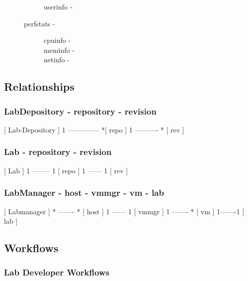 \documentclass[11pt]{article}
\begin{document}
\begin{description}
\begin{description}
\begin{description}
\item [userinfo -]
\end{description}

\item [perfstats -]

\begin{description}
\item [cpuinfo -]
\item [meminfo -]
\item [netinfo -]
\end{description}

\end{description}

\end{description}
\subsection{Relationships}
\label{sec-3.4}

\subsubsection{LabDepository - repository - revision}
\label{sec-3.4.1}


 [ Lab-Depository ] 1 -------------- *[ repo ] 1 ---------- * [ rev ]

\subsubsection{Lab - repository - revision}
\label{sec-3.4.2}


 [ Lab ] 1 -------- 1 [ repo ] 1 ------ 1 [ rev ]

\subsubsection{LabManager - host - vmmgr - vm - lab}
\label{sec-3.4.3}


 [ Labmanager ] * ------- * [ host ] 1 ------ 1 [ vmmgr ] 1 ------- * [ vm ] 1-------1 [ lab ]

\subsection{Workflows}
\label{sec-3.5}

\subsubsection{Lab Developer Workflows}
\label{sec-3.5.1}
\end{document}
